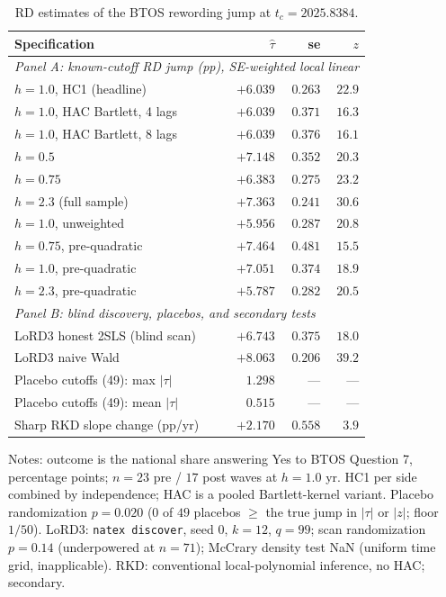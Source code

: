 \documentclass[11pt]{article}
\begin{document}
\begin{table}[t]
\centering
\small
\caption{RD estimates of the BTOS rewording jump at $t_c=2025.8384$.}
\label{tab:rd}
\begin{tabular}{lrrr}
\toprule
Specification & $\hat\tau$ & se & $z$ \\
\midrule
\multicolumn{4}{l}{\emph{Panel A: known-cutoff RD jump (pp), SE-weighted local linear}}\\
$h=1.0$, HC1 (headline)          & $+6.039$ & $0.263$ & $22.9$ \\
$h=1.0$, HAC Bartlett, 4 lags    & $+6.039$ & $0.371$ & $16.3$ \\
$h=1.0$, HAC Bartlett, 8 lags    & $+6.039$ & $0.376$ & $16.1$ \\
$h=0.5$                          & $+7.148$ & $0.352$ & $20.3$ \\
$h=0.75$                         & $+6.383$ & $0.275$ & $23.2$ \\
$h=2.3$ (full sample)            & $+7.363$ & $0.241$ & $30.6$ \\
$h=1.0$, unweighted              & $+5.956$ & $0.287$ & $20.8$ \\
$h=0.75$, pre-quadratic          & $+7.464$ & $0.481$ & $15.5$ \\
$h=1.0$, pre-quadratic           & $+7.051$ & $0.374$ & $18.9$ \\
$h=2.3$, pre-quadratic           & $+5.787$ & $0.282$ & $20.5$ \\
\midrule
\multicolumn{4}{l}{\emph{Panel B: blind discovery, placebos, and secondary tests}}\\
LoRD3 honest 2SLS (blind scan)   & $+6.743$ & $0.375$ & $18.0$ \\
LoRD3 naive Wald                 & $+8.063$ & $0.206$ & $39.2$ \\
Placebo cutoffs (49): max $|\tau|$ & $1.298$ & --- & --- \\
Placebo cutoffs (49): mean $|\tau|$ & $0.515$ & --- & --- \\
Sharp RKD slope change (pp/yr)   & $+2.170$ & $0.558$ & $3.9$ \\
\bottomrule
\end{tabular}

\medskip
\parbox{0.92\textwidth}{\footnotesize Notes: outcome is the national share
answering Yes to BTOS Question 7, percentage points; $n=23$ pre / $17$ post
waves at $h=1.0$ yr. HC1 per side combined by independence; HAC is a pooled
Bartlett-kernel variant. Placebo randomization $p=0.020$ ($0$ of $49$
placebos $\geq$ the true jump in $|\tau|$ or $|z|$; floor $1/50$). LoRD3:
\texttt{natex discover}, seed 0, $k=12$, $q=99$; scan randomization $p=0.14$
(underpowered at $n=71$); McCrary density test NaN (uniform time grid,
inapplicable). RKD: conventional local-polynomial inference, no HAC;
secondary.}
\end{table}
\end{document}
